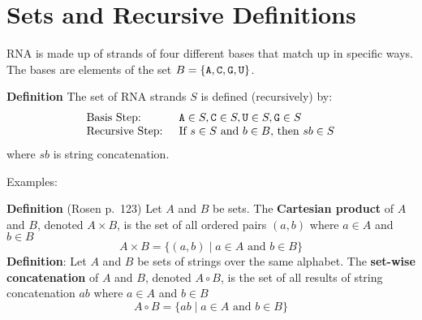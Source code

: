 \documentclass[12pt, oneside]{article}
\begin{document}
\begin{flushright}
\end{flushright}


\section*{Sets and Recursive Definitions}

RNA is made up of strands of four different bases that match up in specific ways.\\
The bases are elements of the set 
$B  = \{\texttt{A}, \texttt{C}, \texttt{G}, \texttt{U} \}$.


{\bf Definition} The set of RNA strands $S$ is defined (recursively) by:
\[
\begin{array}{ll}
\textrm{Basis Step: } & \texttt{A} \in S, \texttt{C} \in S, \texttt{U} \in S, \texttt{G} \in S \\
\textrm{Recursive Step: } & \textrm{If } s \in S\textrm{ and }b \in B \textrm{, then }sb \in S
\end{array}
\]
where $sb$ is string concatenation.

Examples: 


\vfill



\newpage

{\bf Definition} (Rosen p.\ 123) Let $A$ and $B$ be sets.  The {\bf Cartesian product} of $A$ and $B$, denoted
$A \times B$, is the set of all ordered pairs $(a,b)$ where $a \in A$ and $b \in B$
\[
A \times B = \{ (a,b) \mid a \in A \text{ and } b \in B \}
\]
{\bf Definition}: Let $A$ and $B$ be sets of strings over the same alphabet. The {\bf set-wise concatenation} 
of $A$ and $B$, denoted $A \circ B$, is the set of all results of string concatenation $ab$ where $a \in A$ and $b \in B$
\[
A \circ B = \{ ab \mid a \in A \text{ and } b \in B \}
\]
\end{document}
